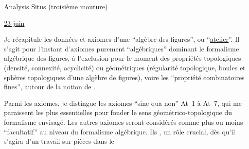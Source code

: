 \begin{center}Analysis Situs (troisième mouture)\end{center}

\uline{23 juin}

Je récapitule les données et axiomes d'une ``algèbre des figures'', ou ``\uline{atelier}''. Il s'agit pour l'instant d'axiomes purement ``algébriques'' dominant le formalisme algébrique des figures, à l'exclusion pour le moment des propriétés topologiques (densité, connexité, acyclicité) ou  géométriques (régularité topologique, boules et sphères topologiques d'une algèbre de figures), voire les ``propriété combinatoires fines'', autour de la notion de .

Parmi les axiomes, je distingue les axiomes ``sine qua non'' At~1 à At~7, qui me paraissent les plus essentielles pour fonder le sens géométrico-topologique du formalisme envisagé. Les autres axiomes seront considérés comme plus ou moins ``facultatif'' au niveau du formalisme algébrique. Ils  ,  un rôle crucial, dès qu'il s'agira d'un travail sur pièces dans le

